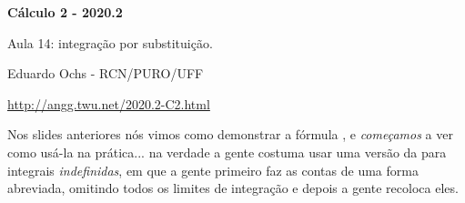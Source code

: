 \documentclass[oneside,12pt]{article}
\begin{document}
\def\Sthree{
  \iequationbox {\Intx{a}{b}{f(g(x))g'(x)}}
                {\Intu{g(a)}{g(b)}{f(u)}}
}
\def\SthreeI{
  \iequationbox {\intx{f(g(x))g'(x)}}
                {\intu{f(u)}
                 \qquad [u=g(x)]
                }
}

\def\Sthree{
  \pmat{
    \D \Intx{a}{b}{f(g(x))g'(x)} \\
    \veq \\
    \D \Intu{g(a)}{g(b)}{f(u)}
  }}

\def\SthreeI{
  \pmat{
    \D \intx{f(g(x))g'(x)} \\
       \veq \\
    \D \intu{f(u)} \\
    \text{Obs: $u=g(x)$.} \\
  }}



\def\Subst#1{\bmat{#1}}




%

\thispagestyle{empty}

\begin{center}

\vspace*{1.2cm}

{\bf \Large Cálculo 2 - 2020.2}

\bsk

Aula 14: integração por substituição.

\bsk

Eduardo Ochs - RCN/PURO/UFF

\url{http://angg.twu.net/2020.2-C2.html}

\end{center}

\newpage


Nos slides anteriores nós vimos como demonstrar a fórmula , e
{\sl começamos} a ver como usá-la na prática... na verdade a gente
costuma usar uma versão da  para integrais {\sl indefinidas},
em que a gente primeiro faz as contas de uma forma abreviada, omitindo
todos os limites de integração e depois a gente recoloca eles.
\end{document}
